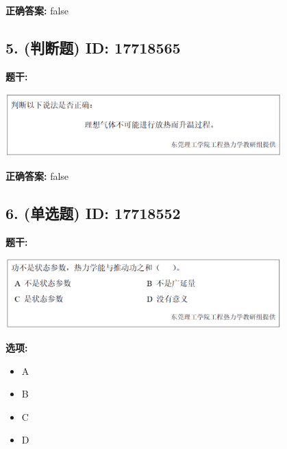 \documentclass[12pt]{article}
\begin{document}
\textbf{正确答案:}
false

\vspace{0.5em}\hrulefill\vspace{1em}

\subsection*{5. (判断题) \small ID: 17718565}

\textbf{题干:}


\begin{center}\includegraphics[width=0.8\textwidth, height=0.25\textheight, keepaspectratio]{question_5_17718565/title_img_1.png}\end{center}

\textbf{正确答案:}
false

\vspace{0.5em}\hrulefill\vspace{1em}

\subsection*{6. (单选题) \small ID: 17718552}

\textbf{题干:}


\begin{center}\includegraphics[width=0.8\textwidth, height=0.25\textheight, keepaspectratio]{question_6_17718552/title_img_1.png}\end{center}

\textbf{选项:}
\begin{itemize}[leftmargin=*]
  \item A

  \item B

  \item C

  \item D

\end{itemize}
\end{document}
